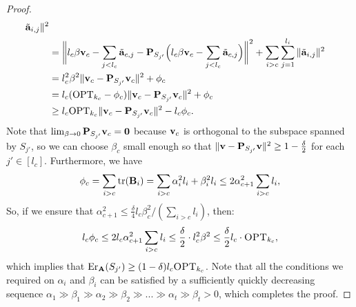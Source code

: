 \documentclass{article}
\begin{document}
\begin{proof}
\begin{align*}
    \tilde{\mathbf a}_{i,j} \|^2\\ 
  &=\bigg\|l_c\beta\mathbf v_c - \sum_{j<l_c}\tilde{\mathbf a}_{c,j}- \mathbf P_{S_{j'}}
    \Big(l_c \beta\mathbf v_c - \sum_{j< l_c}\tilde{\mathbf a}_{c,j} \Big)\bigg\|^2
    +
    \sum_{i>c}\sum_{j=1}^{l_i}\| \tilde{\mathbf a}_{i,j} \|^2
  \\ 
  &= l_c^2\beta^2 \|\mathbf v_c - \mathbf P_{S_{j'}}\mathbf v_c\|^2 + \phi_c \\
  & = l_c (\mathrm{OPT}_{k_c}- \phi_c) \|\mathbf v_c - \mathbf P_{S_{j'}}\mathbf v_c\|^2 + \phi_c \\
  & \geq l_c\mathrm{OPT}_{k_c} \|\mathbf v_c - \mathbf P_{S_{j'}}\mathbf v_c\|^2 - l_c \phi_c. 
\end{align*}	
Note that $\lim_{\beta\rightarrow 0}\mathbf P_{S_{j'}}\mathbf v_c = \mathbf 0$ because $\mathbf v_c$
is orthogonal to the subspace spanned by $S_{j'}$, so we can choose
$\beta_c$ small enough so that
$\|\mathbf v-\mathbf P_{S_{j'}}\mathbf v\|^2\geq 1-\frac\delta2$ for each $j'\in[l_c]$.
Furthermore, we have
\begin{align*}
  \phi_c = \sum_{i>c}\mathrm{tr}(\mathbf B_i) =
  \sum_{i>c}\alpha_i^2l_i+\beta_i^2l_i\leq 2\alpha_{c+1}^2\sum_{i>c}l_i,
\end{align*}
So, if we ensure that $\alpha_{c+1}^2\leq \frac{\delta}{4}
l_c\beta_c^2/(\sum_{i>c}l_i)$, then:
\begin{align*}
  l_c\phi_c \leq 2l_c\alpha_{c+1}^2\sum_{i>c}l_i\leq \frac\delta
  2\cdot l_c^2\beta^2\leq \frac\delta 2 l_c\cdot\textsc{OPT}_{k_c},
\end{align*}
which implies that $\mathrm{Er}_\mathbf A(S_{j'})\geq
(1-\delta)l_c\textsc{OPT}_{k_c}$. Note that all the conditions
we required on $\alpha_i$ and $\beta_i$ can be satisfied by a
sufficiently quickly decreasing sequence
$\alpha_1\gg\beta_1\gg\alpha_2\gg\beta_2\gg...\gg\alpha_t\gg\beta_t>0$,
which completes the proof.
\end{proof}






\end{document}

